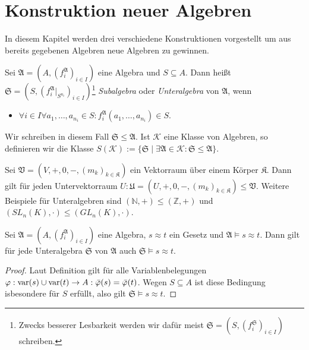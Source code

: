 \section{Konstruktion neuer Algebren}

In diesem Kapitel werden drei verschiedene Konstruktionen vorgestellt um aus bereits gegebenen Algebren neue Algebren zu gewinnen.

\begin{definition}
    Sei $\mathfrak{A}=(A,(f^\mathfrak{A}_i)_{i\in I})$ eine Algebra und $S\subseteq A$. Dann heißt $\mathfrak{S}=(S,(f^\mathfrak{A}_i|_{S^{n_i}})_{i\in I})$\footnote{Zwecks besserer Lesbarkeit werden wir dafür meist $\mathfrak{S}=(S,(f^\mathfrak{S}_i)_{i\in I})$ schreiben.}
    \emph{Subalgebra} oder \emph{Unteralgebra} von $\mathfrak{A}$, wenn
    \begin{itemize}[topsep=0pt, label={--}]
        \item $\forall i\in I\forall a_1,\ldots,a_{n_i}\in S:f^\mathfrak{A}_i(a_1,\ldots,a_{n_i})\in S.$
    \end{itemize}
    Wir schreiben in diesem Fall $\mathfrak{S}\le \mathfrak{A}$. Ist $\mathcal{K}$ eine Klasse von Algebren,
    so definieren wir die Klasse $S(\mathcal{K}):=\{\mathfrak{S} \mid \exists \mathfrak{A}\in \mathcal{K}:\mathfrak{S}\le\mathfrak{A}\}$.
\end{definition}

\begin{example}
    Sei $\mathfrak{V}=(V,+,0,-,(m_k)_{k\in\mathfrak{K}})$ ein Vektorraum über einem Körper $\mathfrak{K}$. Dann gilt für
    jeden Untervektorraum $U:\mathfrak{U}=(U,+,0,-,(m_k)_{k\in\mathfrak{K}})\le \mathfrak{V}$. Weitere
    Beispiele für Unteralgebren sind $(\mathbb{N},+)\le(\mathbb{Z},+)$ und $(SL_n(K),\cdot)\le (GL_n(K),\cdot)$.
\end{example}

\begin{proposition}\label{prop:unteralgebra}
    Sei $\mathfrak{A}=(A,(f^\mathfrak{A}_i)_{i\in I})$ eine Algebra, $s\approx t$ ein Gesetz und $\mathfrak{A}\models s\approx t$.
    Dann gilt für jede Unteralgebra $\mathfrak{S}$ von $\mathfrak{A}$ auch $\mathfrak{S}\models s\approx t$.
\end{proposition}

\begin{proof}
    Laut Definition gilt für alle Variablenbelegungen $\varphi:\operatorname{var}(s)\cup \operatorname{var}(t)\to A:\bar{\varphi}(s)=\bar{\varphi}(t)$.
    Wegen $S\subseteq A$ ist diese Bedingung isbesondere für $S$ erfüllt, also gilt $\mathfrak{S}\models s\approx t$.
\end{proof}

